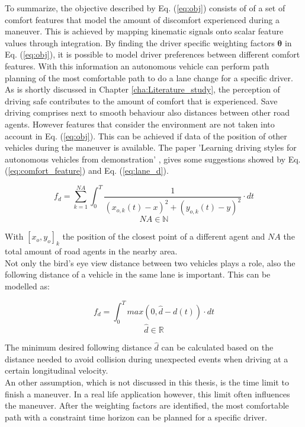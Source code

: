 To summarize, the objective described by Eq. (\ref{eq:obj}) consists of of a set of comfort features that model the amount of discomfort experienced during a maneuver. This is achieved by mapping kinematic signals onto scalar feature values through integration. By finding the driver specific weighting factors $\bm{\theta}$ in Eq. (\ref{eq:obj}), it is possible to model driver preferences between different comfort features. With this information an autonomous vehicle can perform path planning of the most comfortable path to do a lane change for a specific driver.\\

As is shortly discussed in Chapter \ref{cha:Literature_study}, the perception of driving safe contributes to the amount of comfort that is experienced. Save driving comprises next to smooth behaviour also distances between other road agents. However features that consider the environment are not taken into account in Eq. (\ref{eq:obj}). This can be achieved if data of the position of other vehicles during the maneuver is available. The paper 'Learning driving styles for autonomous vehicles from demonstration' \cite{Kuderer2015a}, gives some suggestions showed by Eq. (\ref{eq:comfort_feature}) and  Eq. (\ref{eq:lane_d}).  
\newpage

\begin{equation}\label{eq:comfort_feature}
f_d= \sum_{k = 1}^{NA}\int_{0}^{T}\frac{1}{(x_{o,k}(t)-x)^2+(y_{o,k}(t)-y)^2}\cdot dt
\end{equation}
\[NA \in \mathbb{N}\]

With $[x_o,y_o]_k$ the position of the closest point of a different agent and $NA$ the total amount of road agents in the nearby area.\\

Not only the bird's eye view distance between two vehicles plays a role, also the following distance of a vehicle in the same lane is important. This can be modelled as:  

\begin{equation}\label{eq:lane_d}
f_d= \int_{0}^{T} max(0,\hat{d}-d(t))\cdot dt
\end{equation}
\[\hat{d} \in \mathbb{R}\]


The minimum desired following distance $\hat{d}$ can be calculated based on the  distance needed to avoid collision during unexpected events when driving at a certain longitudinal velocity. \\

An other assumption, which is not discussed in this thesis, is the time limit to finish a maneuver. In a real life application however, this limit often influences the maneuver. After the weighting factors are identified, the most comfortable path with a constraint time horizon can be planned for a specific driver. 

